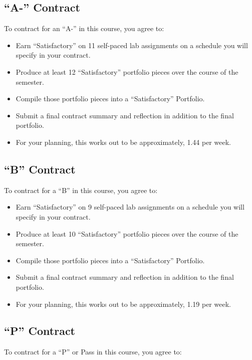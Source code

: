 \documentclass[
]{book}
\begin{document}
\subsection*{``A-'' Contract}\label{a--contract-1}


To contract for an ``A-'' in this course, you agree to:

\begin{itemize}
\item
  Earn ``Satisfactory'' on 11 self-paced lab assignments on a schedule you will specify in your contract.
\item
  Produce at least 12 ``Satisfactory'' portfolio pieces over the course of the semester.
\item
  Compile those portfolio pieces into a ``Satisfactory'' Portfolio.
\item
  Submit a final contract summary and reflection in addition to the final portfolio.
\item
  For your planning, this works out to be approximately, 1.44 per week.
\end{itemize}

\subsection*{``B'' Contract}\label{b-contract-1}


To contract for a ``B'' in this course, you agree to:

\begin{itemize}
\item
  Earn ``Satisfactory'' on 9 self-paced lab assignments on a schedule you will specify in your contract.
\item
  Produce at least 10 ``Satisfactory'' portfolio pieces over the course of the semester.
\item
  Compile those portfolio pieces into a ``Satisfactory'' Portfolio.
\item
  Submit a final contract summary and reflection in addition to the final portfolio.
\item
  For your planning, this works out to be approximately, 1.19 per week.
\end{itemize}

\subsection*{``P'' Contract}\label{p-contract-1}


To contract for a ``P'' or Pass in this course, you agree to:
\end{document}
